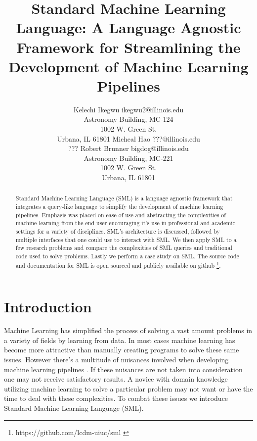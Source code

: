 \documentclass[jair,twoside,11pt,theapa]{article}
\begin{document}
\title{Standard Machine Learning Language: A Language Agnostic Framework for Streamlining the Development of Machine Learning Pipelines}

\author{\name Kelechi Ikegwu \email ikegwu2@illinois.edu \\
        Astronomy Building, MC-124 \\1002 W. Green St.\\ Urbana, IL  61801
       \AND
       \name Micheal Hao  \email ???@illinois.edu \\
       \addr ???
       \AND
       \name Robert Brunner \email bigdog@illinois.edu\\
        Astronomy Building, MC-221 \\1002 W. Green St.\\ Urbana, IL  61801}


\maketitle


\begin{abstract}
Standard Machine Learning Language (SML) is a language agnostic framework that integrates a query-like language to simplify the development of machine learning pipelines. Emphasis was placed on ease of use and abstracting the complexities of machine learning from the end user encouraging it's use in professional and academic settings for a variety of disciplines. SML's architecture is discussed, followed by multiple interfaces that one could use to interact with SML. We then apply SML to a few research problems and compare the complexities of SML queries and traditional code used to solve problems. Lastly we perform a case study on SML. The source code and documentation for SML is open sourced and publicly available on github \footnote{https://github.com/lcdm-uiuc/sml \label{SML:Github}}.
\end{abstract}

\section{Introduction}
\label{Introduction}

Machine Learning has simplified the process of solving a vast amount problems in a variety of fields by learning from data. In most cases machine learning has become more attractive than manually creating programs to solve these same issues. However there's a multitude of nuisances involved when developing machine learning pipelines \cite{pedros:fewUsefulThings}. If these nuisances are not taken into consideration one may not receive satisfactory results. A novice with domain knowledge utilizing machine learning to solve a particular problem may not want or have the time to deal with these complexities. To combat these issues we introduce Standard Machine Learning Language (SML).
\end{document}
